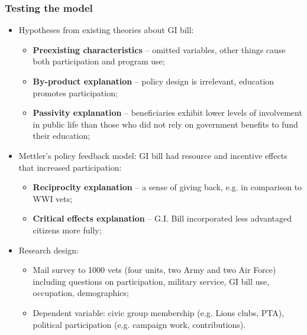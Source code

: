 \documentclass[aspectratio=169]{beamer}
\theoremstyle{principle}
\begin{document}
\begin{frame}
\frametitle{Testing the model}
\begin{itemize}
\item Hypotheses from existing theories about GI bill:
\begin{itemize}
\item \textbf{Preexisting characteristics} -- omitted variables, other things cause both participation and program use;
\item \textbf{By-product explanation} -- policy design is irrelevant, education promotes participation;
\item \textbf{Passivity explanation} -- beneficiaries exhibit lower levels of involvement in public life than those who did not rely on government benefits to fund their education;
\end{itemize}
\bigskip
\bigskip
\item Mettler's policy feedback model: GI bill had resource and incentive effects that increased participation:
\begin{itemize}
\item \textbf{Reciprocity explanation} -- a sense of giving back, e.g. in comparison to WWI vets;
\item \textbf{Critical effects explanation} -- G.I. Bill incorporated less advantaged citizens more fully;
\end{itemize}
\bigskip
\bigskip
\item Research design:
\begin{itemize}
\item Mail survey to 1000 vets (four units, two Army and two Air Force) including questions on participation, military service, GI bill use, occupation, demographics;
\item Dependent variable: civic group membership (e.g. Lions clubs, PTA), political participation (e.g. campaign work, contributions).
\end{itemize}
\end{itemize}
\end{frame}
\end{document}
